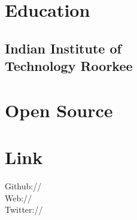 \documentclass[]{deedy-resume-openfont}
\begin{document}
\begin{minipage}[t]{0.33\textwidth}


\section{Education}


\subsection{Indian Institute of \\ Technology Roorkee}
\sectionsep


\section{Open Source}
    \textbullet{} \href{https://github.com/sympy/sympy}{} \textbullet{} \href{http://mpmath.org/}{} \textbullet{} \href{https://www.libreoffice.org}{}


\section{Link}
Github:// \href{https://github.com/gxyd}{} \\
Web:// \href{https://gxyd.github.io}{} \\
Twitter://  \href{https://twitter.com/axyd0000}{} \\
\sectionsep


\end{minipage}
\end{document}
